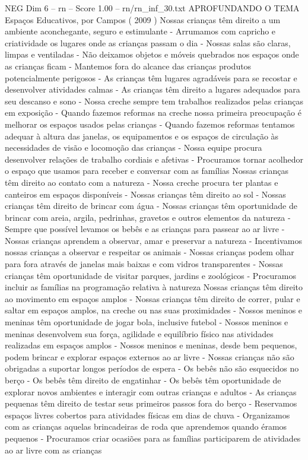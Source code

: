 \begin{textsample}{NEG Dim 6 – rn – Score 1.00 – rn/rn\_inf\_30.txt}  \label{ex:f6_neg_058}
APROFUNDANDO O TEMA Espaços Educativos, por Campos ( 2009 ) Nossas crianças têm direito a um ambiente aconchegante, seguro e estimulante - Arrumamos com capricho e criatividade os lugares onde as crianças passam o dia - Nossas salas são claras, limpas e ventiladas - Não deixamos objetos e móveis quebrados nos espaços onde as crianças ficam - Mantemos fora do alcance das crianças produtos potencialmente perigosos - As crianças têm lugares agradáveis para se recostar e desenvolver atividades calmas - As crianças têm direito a lugares adequados para seu descanso e sono - Nossa creche sempre tem trabalhos realizados pelas crianças em exposição - Quando fazemos reformas na creche nossa primeira preocupação é melhorar os espaços usados pelas crianças - Quando fazemos reformas tentamos adequar à altura das janelas, os equipamentos e os espaços de circulação às necessidades de visão e locomoção das crianças - Nossa equipe procura desenvolver relações de trabalho cordiais e afetivas - Procuramos tornar acolhedor o espaço que usamos para receber e conversar com as famílias Nossas crianças têm direito ao contato com a natureza - Nossa creche procura ter plantas e canteiros em espaços disponíveis - Nossas crianças têm direito ao sol - Nossas crianças têm direito de brincar com água - Nossas crianças têm oportunidade de brincar com areia, argila, pedrinhas, gravetos e outros elementos da natureza - Sempre que possível levamos os bebês e as crianças para passear ao ar livre - Nossas crianças aprendem a observar, amar e preservar a natureza - Incentivamos nossas crianças a observar e respeitar os animais - Nossas crianças podem olhar para fora através de janelas mais baixas e com vidros transparentes - Nossas crianças têm oportunidade de visitar parques, jardins e zoológicos - Procuramos incluir as famílias na programação relativa à natureza Nossas crianças têm direito ao movimento em espaços amplos - Nossas crianças têm direito de correr, pular e saltar em espaços amplos, na creche ou nas suas proximidades - Nossos meninos e meninas têm oportunidade de jogar bola, inclusive futebol - Nossos meninos e meninas desenvolvem sua força, agilidade e equilíbrio físico nas atividades realizadas em espaços amplos - Nossos meninos e meninas, desde bem pequenos, podem brincar e explorar espaços externos ao ar livre - Nossas crianças não são obrigadas a suportar longos períodos de espera - Os bebês não são esquecidos no berço - Os bebês têm direito de engatinhar - Os bebês têm oportunidade de explorar novos ambientes e interagir com outras crianças e adultos - As crianças pequenas têm direito de testar seus primeiros passos fora do berço - Reservamos espaços livres cobertos para atividades físicas em dias de chuva - Organizamos com as crianças aquelas brincadeiras de roda que aprendemos quando éramos pequenos - Procuramos criar ocasiões para as famílias participarem de atividades ao ar livre com as crianças

\end{textsample}
